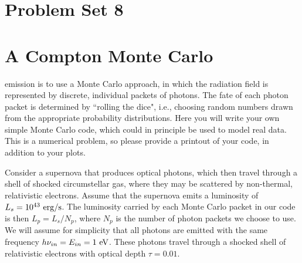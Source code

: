 \documentclass[11pt]{article}
\begin{document}
\pagestyle{empty}

\section*{\centering Problem Set 8}

\section{A Compton Monte Carlo}

emission is to use a Monte Carlo approach, in which the radiation field is
represented by discrete, individual packets of photons. The fate of each photon
packet is determined by ``rolling the dice", i.e., choosing random numbers drawn
from the appropriate probability distributions. Here you will write your own
simple Monte Carlo code, which could in principle be used to model real data.
This is a numerical problem, so please provide a printout of your code, in
addition to your plots.

Consider a supernova that produces optical photons, which then travel through a
shell of shocked circumstellar gas, where they may be scattered by non-thermal,
relativistic electrons. Assume that the supernova emits a luminosity of
$L_s=10^{43}~{\rm erg}/{\rm s}$.  The luminosity carried by each Monte
Carlo packet in our code is then $L_p=L_s/N_p$, where $N_p$ is the number of
photon packets we choose to use.  We will assume for simplicity that all photons are emitted with
the same frequency $h\nu_{in}=E_{in}=1~{\rm eV}$.  
These photons travel through a shocked shell of relativistic electrons with optical depth
$\tau=0.01$.
\end{document}
